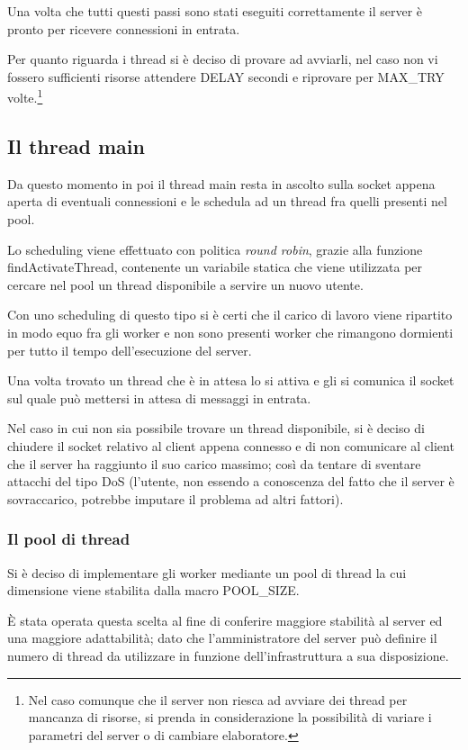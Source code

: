 \documentclass[a4paper,10pt]{article}
\begin{document}
Una volta che tutti questi passi sono stati eseguiti correttamente il server \`e pronto per ricevere connessioni in entrata.

Per quanto riguarda i thread si \`e deciso di provare ad avviarli, nel caso non vi fossero sufficienti risorse attendere DELAY secondi e riprovare per MAX\_TRY volte.\footnote{Nel caso comunque che il server non riesca ad avviare dei thread per mancanza di risorse, si prenda in considerazione la possibilit\`a di variare i parametri del server o di cambiare elaboratore.}

\subsection{Il thread main}

Da questo momento in poi il thread main resta in ascolto sulla socket appena aperta di eventuali connessioni e le schedula ad un thread fra quelli presenti nel pool.

Lo scheduling viene effettuato con politica \emph{round robin}, grazie alla funzione findActivateThread, contenente un variabile statica che viene utilizzata per cercare nel pool un thread disponibile a servire un nuovo utente.

Con uno scheduling di questo tipo si \`e certi che il carico di lavoro viene ripartito in modo equo fra gli worker e non sono presenti worker che rimangono dormienti per tutto il tempo dell'esecuzione del server.

Una volta trovato un thread che \`e in attesa lo si attiva e gli si comunica il socket sul quale pu\`o mettersi in attesa di messaggi in entrata.

Nel caso in cui non sia possibile trovare un thread disponibile, si \`e deciso di chiudere il socket relativo al client appena connesso e di non comunicare al client che il server ha raggiunto il suo carico massimo; cos\`i da tentare di sventare attacchi del tipo DoS (l'utente, non essendo a conoscenza del fatto che il server \`e sovraccarico, potrebbe imputare il problema ad altri fattori).

\subsubsection{Il pool di thread}

Si \`e deciso di implementare gli worker mediante un pool di thread la cui dimensione viene stabilita dalla macro POOL\_SIZE.

\`E stata operata questa scelta al fine di conferire maggiore stabilit\`a al server ed una maggiore adattabilit\`a; dato che l'amministratore del server pu\`o definire il numero di thread da utilizzare in funzione dell'infrastruttura a sua disposizione.
\end{document}
